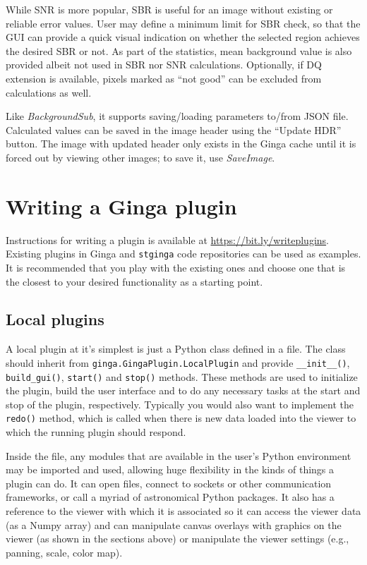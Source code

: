 \documentclass[11pt,twoside]{article}
\begin{document}

While SNR is more popular, SBR is useful for an image without existing or
reliable error values. User may define a minimum limit for SBR check,
so that the GUI can provide a quick visual indication on whether the
selected region achieves the desired SBR or not.
As part of the statistics, mean background value is also
provided albeit not used in SBR nor SNR calculations.
Optionally, if DQ extension is available, pixels marked as
``not good'' can be excluded from calculations as well.

Like {\em BackgroundSub}, it supports saving/loading parameters to/from
JSON file.
Calculated values can be saved in the image header using the ``Update HDR''
button.
The image with updated header only exists in the Ginga cache until it
is forced out by viewing other images; to save it, use {\em SaveImage}.

\section{Writing a Ginga plugin}

Instructions for writing a plugin is available at
\url{https://bit.ly/writeplugins}.
Existing plugins in Ginga and {\tt stginga} code repositories can be used as
examples. It is recommended that you play with the existing ones and
choose one that is the closest to your desired functionality as a
starting point.

\subsection{Local plugins}

A local plugin at it's simplest is just a Python class defined in a file.
The class should inherit from {\tt ginga.GingaPlugin.LocalPlugin}
and provide {\tt \_\_init\_\_()}, {\tt build\_gui()}, {\tt start()}
and {\tt stop()} methods.  These methods are used to initialize the
plugin, build the user interface and to do any necessary tasks at the
start and stop of the plugin, respectively. Typically you would also
want to implement the {\tt redo()} method, which is called when there is
new data loaded into the viewer to which the running plugin should respond.

Inside the file, any modules that are available in the user's Python
environment may be imported and used, allowing huge flexibility in
the kinds of things a plugin can do.  It can open files, connect to
sockets or other communication frameworks, or call a myriad of
astronomical Python packages.  It also has a reference to the viewer with
which it is associated so it can access the viewer data (as a Numpy array)
and can manipulate canvas overlays with graphics on the viewer (as shown
in the sections above) or manipulate the viewer settings (e.g., panning,
scale, color map).
\end{document}

